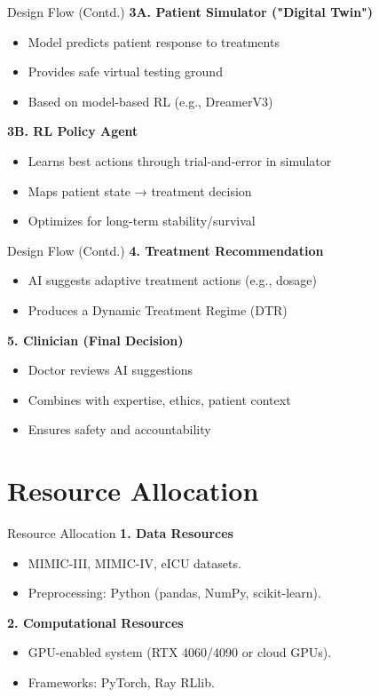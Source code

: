 \documentclass[11pt]{beamer}
\begin{document}
\begin{frame}{Design Flow (Contd.)}
    \textbf{3A. Patient Simulator ("Digital Twin")}
    \begin{itemize}
        \item Model predicts patient response to treatments
        \item Provides safe virtual testing ground
        \item Based on model-based RL (e.g., DreamerV3)
    \end{itemize}

    \vspace{0.3cm}
    \textbf{3B. RL Policy Agent}
    \begin{itemize}
        \item Learns best actions through trial-and-error in simulator
        \item Maps patient state → treatment decision
        \item Optimizes for long-term stability/survival
    \end{itemize}
\end{frame}

\begin{frame}{Design Flow (Contd.)}
    \textbf{4. Treatment Recommendation}
    \begin{itemize}
        \item AI suggests adaptive treatment actions (e.g., dosage)
        \item Produces a Dynamic Treatment Regime (DTR)
    \end{itemize}

    \vspace{0.3cm}
    \textbf{5. Clinician (Final Decision)}
    \begin{itemize}
        \item Doctor reviews AI suggestions
        \item Combines with expertise, ethics, patient context
        \item Ensures safety and accountability
    \end{itemize}
\end{frame}

\section{Resource Allocation}
\begin{frame}{Resource Allocation}
\textbf{1. Data Resources}  
\begin{itemize}
    \item MIMIC-III, MIMIC-IV, eICU datasets.
    \item Preprocessing: Python (pandas, NumPy, scikit-learn).
\end{itemize}

\textbf{2. Computational Resources}  
\begin{itemize}
    \item GPU-enabled system (RTX 4060/4090 or cloud GPUs).
    \item Frameworks: PyTorch, Ray RLlib.
\end{itemize}
\end{frame}
\end{document}
